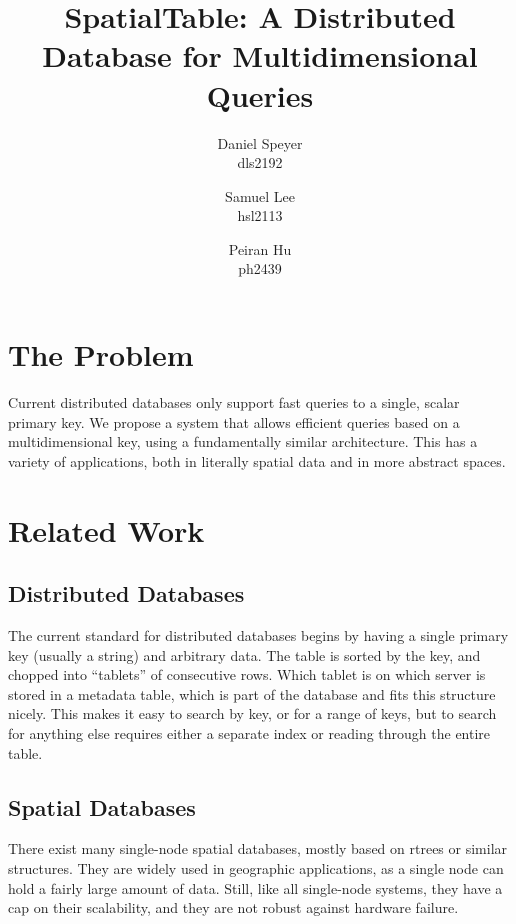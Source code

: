 \documentclass[11pt]{article}
\begin{document}
\author{Daniel Speyer\\dls2192 \and Samuel Lee\\hsl2113 \and Peiran Hu\\ph2439}
\title{SpatialTable: A Distributed Database for Multidimensional Queries}

\maketitle

\section{The Problem}
Current distributed databases only support fast queries to a single, scalar primary key. We propose a system that allows efficient queries based on a multidimensional key, using a fundamentally similar architecture. This has a variety of applications, both in literally spatial data and in more abstract spaces.
\section{Related Work}

\subsection{Distributed Databases}

The current standard for distributed databases begins by having a single primary key (usually a string) and arbitrary data. The table is sorted by the key, and chopped into ``tablets'' of consecutive rows. Which tablet is on which server is stored in a metadata table, which is part of the database and fits this structure nicely. This makes it easy to search by key, or for a range of keys, but to search for anything else requires either a separate index or reading through the entire table.

\subsection{Spatial Databases}

There exist many single-node spatial databases, mostly based on rtrees or similar structures. They are widely used in geographic applications, as a single node can hold a fairly large amount of data. Still, like all single-node systems, they have a cap on their scalability, and they are not robust against hardware failure.
\end{document}
